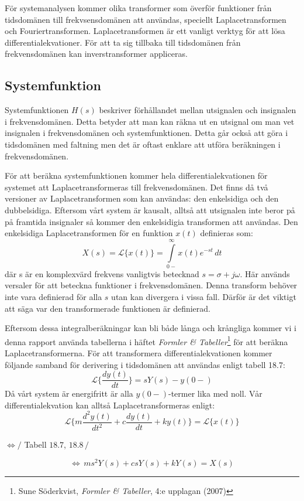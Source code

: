 För systemanalysen kommer olika transformer som överför funktioner från tidsdomänen till frekvsensdomänen att användas, speciellt Laplacetransformen och Fouriertransformen.
Laplacetransformen är ett vanligt verktyg för att lösa differentialekvationer. För att ta sig tillbaka till tidsdomänen från frekvensdomänen kan inverstransformer appliceras.

\subsection{Systemfunktion}
Systemfunktionen $H(s)$ beskriver förhållandet mellan utsignalen och insignalen i frekvensdomänen. Detta betyder att man kan räkna ut en utsignal om man vet insignalen i frekvensdomänen och systemfunktionen. 
Detta går också att göra i tidsdomänen med faltning men det är oftast enklare att utföra beräkningen i frekvensdomänen.

För att beräkna systemfunktionen kommer hela differentialekvationen för systemet att Laplacetransformeras till frekvensdomänen. Det finns då två versioner av Laplacetransformen som kan användas: den enkelsidiga och den dubbelsidiga.
Eftersom vårt system är kausalt, alltså att utsignalen inte beror på på framtida insignaler så kommer den enkelsidigia transformen att användas.
Den enkelsidiga Laplacetransformen för en funktion $x(t)$ definieras som:
$$X(s) = \mathcal{L}\big\{x(t)\big\} = \int\limits_{0-}^{\infty} x(t)e^{-st}\,dt$$
där s är en komplexvärd frekvens vanligtvis betecknad $s=\sigma+j\omega$.
Här används versaler för att beteckna funktioner i frekvensdomänen.
Denna transform behöver inte vara definierad för alla $s$ utan kan divergera i vissa fall. Därför är det viktigt att säga var den transformerade funktionen är definierad. 

Eftersom dessa integralberäkningar kan bli både långa och krångliga kommer vi i denna rapport använda tabellerna i häftet \textit{Formler \& Tabeller}\footnote{Sune Söderkvist, \textit{Formler \& Tabeller}, 4:e upplagan (2007)} för att beräkna Laplacetransformerna.
För att transformera differentialekvationen kommer följande samband för derivering i tidsdomänen att användas enligt tabell 18.7:
$$\mathcal{L}\bigg\{\frac{dy(t)}{dt}\bigg\} = sY(s)-y(0-)$$
Då vårt system är energifritt är alla $y(0-)$-termer lika med noll. Vår differentialekvation kan alltså Laplacetransformeras enligt:
$$ \mathcal{L}\bigg\{m\displaystyle\frac{d^2y(t)}{dt^2} + c\displaystyle\frac{dy(t)}{dt} + ky(t)\bigg\}= \mathcal{L}\bigg\{x(t)\bigg\} $$
\begin{center}$ \Longleftrightarrow \bigg/$ Tabell $18.7$, $18.8\,\bigg/$ \end{center}
$$ \Longleftrightarrow\, ms^2Y(s)+csY(s)+kY(s)=X(s)$$

